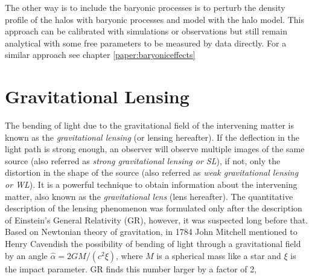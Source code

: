 The other way is to include the baryonic processes is to perturb the density profile 
of the halos with baryonic processes and model with the halo model. This approach can 
be calibrated with simulations or observations but still remain analytical with some 
free parameters to be measured by data directly. 
For a similar approach see chapter \ref{paper:baryoniceffects}




\section{Gravitational Lensing}
The bending of light due to the gravitational field of the intervening matter is known as
the {\it gravitational lensing} (or lensing hereafter). If the deflection in the light
path is strong enough, an observer will observe multiple images of the same source 
(also referred as {\it strong gravitational lensing or SL}), 
if not, only the distortion in the shape of the source  
(also referred as {\it weak gravitational lensing or WL}). It is a powerful technique to 
obtain information about the intervening matter, also known as the {\it gravitational
lens} (lens hereafter). The quantitative description of the lensing phenomenon
was formulated only after the description of Einstein's General Relativity (GR), however,
it was suspected long before that. Based on Newtonian theory of gravitation, in 1784 
John Mitchell mentioned to Henry Cavendish the possibility of bending of light
through a gravitational field by an angle $\hat{\alpha} = 2GM/(c^2 \xi)$, where $M$ is a spherical
mass like a star and $\xi$ is the impact parameter. GR finds this number larger 
by a factor of 2,

